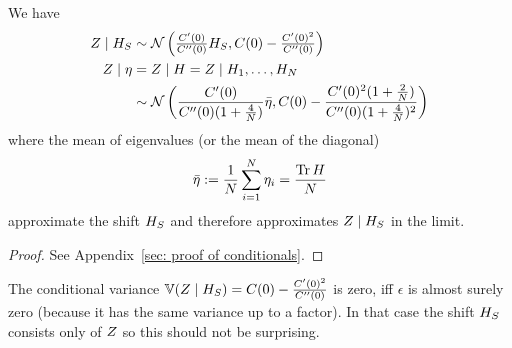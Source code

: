 \begin{theorem}
	\label{thm: conditional distributions of rf}
	We have
	\begin{align}
		Z\mid H_S
		&\sim \mathcal{N}\left(
			\tfrac{C'(0)}{C''(0)} H_S,
			C(0) - \tfrac{C'(0)^2}{C''(0)}
		\right)\\
		Z\mid \eta
		&=Z\mid H = Z \mid H_1,\dots, H_N
		\nonumber\\
		&\sim \mathcal{N}\left(
		\frac{C'(0)}{C''(0)(1+\tfrac4{N})}\bar{\eta},
		C(0)-\frac{C'(0)^2(1+\tfrac2{N})}{C''(0)(1+\tfrac4{N})^2}
	\right)
	\end{align}
	where the mean of eigenvalues (or the mean of the diagonal)
	\[
		\bar{\eta}
		:=\frac1{N}\sum_{i=1}^N \eta_i
		=\frac{\operatorname{Tr}{H}}{N}
	\]
	approximate the shift \(H_S\) and therefore approximates \(Z\mid H_S\) in
	the limit.
\end{theorem}
\begin{proof}
	See Appendix~\ref{sec: proof of conditionals}.
\end{proof}
\begin{remark}
	The conditional variance \(\mathbb{V}(Z\mid H_S)= C(0) -
	\tfrac{C'(0)^2}{C''(0)}\) is zero, iff \(\epsilon\) is almost surely
	zero (because it has the same variance up to a factor). In that case the
	shift \(H_S\) consists only of \(Z\) so this should not be surprising.
\end{remark}


